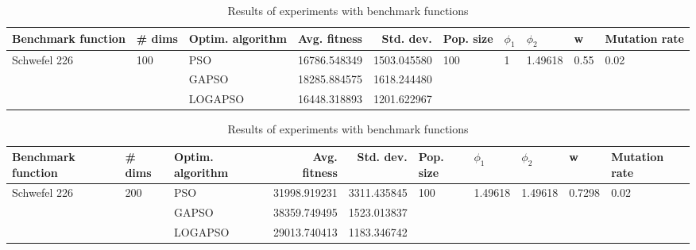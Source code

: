 \documentclass{article}
\begin{document}
\begin{table}
\centering
\caption{Results of experiments with benchmark functions}
\begin{tabular}{lllrrlllll}
\toprule
           Benchmark function &              \# dims & Optim. algorithm &  Avg. fitness &   Std. dev. &            Pop. size &         $\phi_{1}$ &               $\phi_{2}$ &                     w &         Mutation rate \\
\midrule
\multirow{3}{*}{Schwefel 226} & \multirow{3}{*}{100} &              PSO &  16786.548349 & 1503.045580 & \multirow{3}{*}{100} & \multirow{3}{*}{1} & \multirow{3}{*}{1.49618} & \multirow{3}{*}{0.55} & \multirow{3}{*}{0.02} \\
                              &                      &            GAPSO &  18285.884575 & 1618.244480 &                      &                    &                          &                       &                       \\
                              &                      &          LOGAPSO &  16448.318893 & 1201.622967 &                      &                    &                          &                       &                       \\
\bottomrule
\end{tabular}
\end{table}
\begin{table}
\centering
\caption{Results of experiments with benchmark functions}
\begin{tabular}{lllrrlllll}
\toprule
           Benchmark function &              \# dims & Optim. algorithm &  Avg. fitness &   Std. dev. &            Pop. size &               $\phi_{1}$ &               $\phi_{2}$ &                       w &         Mutation rate \\
\midrule
\multirow{3}{*}{Schwefel 226} & \multirow{3}{*}{200} &              PSO &  31998.919231 & 3311.435845 & \multirow{3}{*}{100} & \multirow{3}{*}{1.49618} & \multirow{3}{*}{1.49618} & \multirow{3}{*}{0.7298} & \multirow{3}{*}{0.02} \\
                              &                      &            GAPSO &  38359.749495 & 1523.013837 &                      &                          &                          &                         &                       \\
                              &                      &          LOGAPSO &  29013.740413 & 1183.346742 &                      &                          &                          &                         &                       \\
\bottomrule
\end{tabular}
\end{table}
\end{document}
